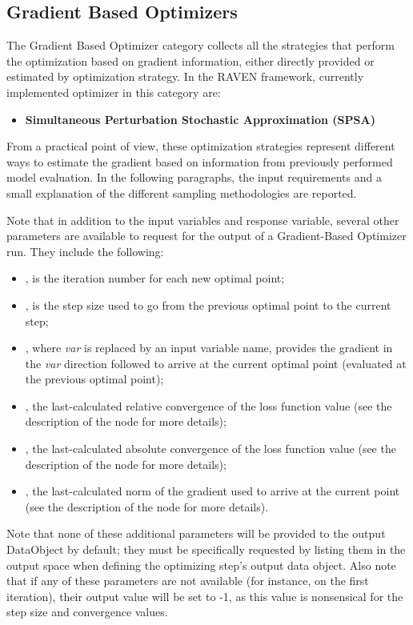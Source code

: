 \subsection{Gradient Based Optimizers}
\label{subsec:gradientBasedOptimizers}
The Gradient Based Optimizer category collects all the strategies that perform the optimization based on gradient information,
 either directly provided or estimated by optimization strategy. In the RAVEN framework, currently implemented optimizer in this
 category are:
\begin{itemize}
\item \textbf{Simultaneous Perturbation Stochastic Approximation (SPSA)}
\end{itemize}

From a practical point of view, these optimization strategies represent different ways to estimate the gradient based on information
from previously performed model evaluation. In the following paragraphs, the input requirements and a small explanation of the
different sampling methodologies are reported.

Note that in addition to the input variables and response variable, several other parameters are available to
request for the output of a Gradient-Based Optimizer run.  They include the following:
\begin{itemize}
  \item {}, is the iteration number for each new optimal point;
  \item {}, is the step size used to go from the previous optimal point to the current step;
  \item {}, where \emph{var} is replaced by an input variable name, provides the
    gradient in the \emph{var} direction followed to arrive at the current optimal point (evaluated at the
    previous optimal point);
  \item {}, the last-calculated relative convergence of the loss function value
    (see the description of the  node for more details);
  \item {}, the last-calculated absolute convergence of the loss function value
    (see the description of the  node for more details);
  \item {}, the last-calculated norm of the gradient used to arrive at the
    current point (see the description of the  node for more details).
\end{itemize}
Note that none of these additional parameters will be provided to the output DataObject by default; they must
be specifically requested by listing them in the output space when defining the optimizing step's output data
object.  Also note that if any of these parameters are not available (for instance, on the first iteration),
their output value will be set to -1, as this value is nonsensical for the step size and convergence values.

